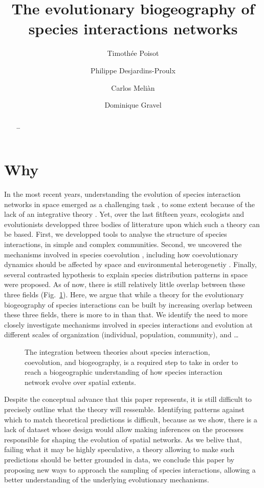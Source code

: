 \documentclass[11pt,oneside]{article}
\title{The evolutionary biogeography of species interactions networks}
\author{Timoth\'ee Poisot \and Philippe Desjardins-Proulx \and Carlos Meli\`an \and Dominique Gravel}
\begin{document}
\maketitle
\begin{abstract}
	\ldots 
\end{abstract}
\onehalfspacing\clearpage


\section{Why}

In the most recent years, understanding the evolution of species interaction
networks in space emerged as a challenging task \parencite{Pillai2011}, to some
extent because of the lack of an integrative theory \parencite{Urban2008}. Yet,
over the last fitfteen years, ecologists and evolutionists developped three
bodies of litterature upon which such a theory can be based. First, we
developped tools to analyse the structure of species interactions, in simple and
complex communities. Second, we uncovered the mechanisms involved in species
coevolution \parencite{Thompson1994a}, including how coevolutionary dynamics
should be affected by space and environmental heterogenetiy
\parencite{Thompson2005}.
Finally, several contrasted hypothesis to explain species distribution patterns
in space were proposed. As of now, there is still relatively little overlap
between these three fields (Fig.~\ref{f:venn}). Here, we argue that while a
theory for the evolutionary biogeography of species interactions can be built by
increasing overlap between these three fields, there is more to in than that. We
identify the need to more closely investigate mechanisms involved in species
interactions and evolution at different scales of organization (individual,
population, community), and \ldots

\begin{figure}[htbp]
   \centering
   
   \caption{The integration between theories about species interaction, coevolution, and biogeography,
    is a required step to take in order to reach a biogeographic understanding of how species interaction network evolve over
    spatial extents.}
   \label{f:venn}
\end{figure}

Despite the conceptual advance that this paper represents, it is still difficult
to precisely outline what the theory will ressemble. Identifying patterns
against which to match theoretical predictions is difficult, because as we show,
there is a lack of dataset whose design would allow making inferences on the
processes responsible for shaping the evolution of spatial networks. As we
belive that, failing what it may be highly speculative, a theory allowing to
make such predictions should be better grounded in data, we conclude this paper
by proposing new ways to approach the sampling of species interactions, allowing
a better understanding of the underlying evolutionary mechanisms.
\end{document}
